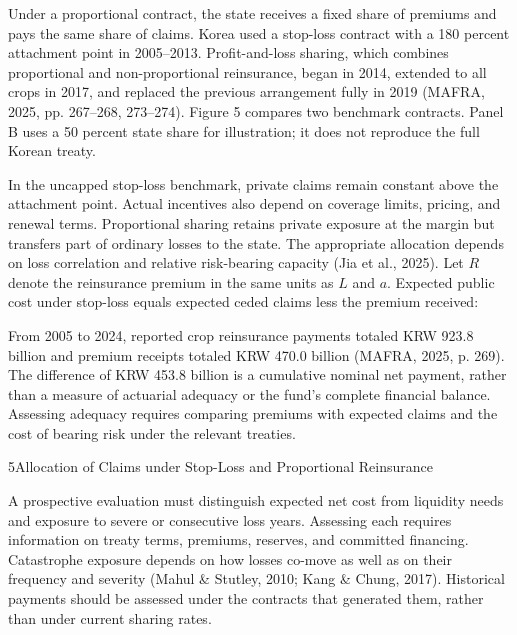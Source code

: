 
Under a proportional contract, the state receives a fixed share of premiums and pays the same share of claims. Korea used a stop-loss contract with a 180 percent attachment point in 2005--2013. Profit-and-loss sharing, which combines proportional and non-proportional reinsurance, began in 2014, extended to all crops in 2017, and replaced the previous arrangement fully in 2019 (MAFRA, 2025, pp. 267--268, 273--274). Figure 5 compares two benchmark contracts. Panel B uses a 50 percent state share for illustration; it does not reproduce the full Korean treaty.

In the uncapped stop-loss benchmark, private claims remain constant above the attachment point. Actual incentives also depend on coverage limits, pricing, and renewal terms. Proportional sharing retains private exposure at the margin but transfers part of ordinary losses to the state. The appropriate allocation depends on loss correlation and relative risk-bearing capacity (Jia et al., 2025). Let \(R\) denote the reinsurance premium in the same units as \(L\) and \(a\). Expected public cost under stop-loss equals expected ceded claims less the premium received:


From 2005 to 2024, reported crop reinsurance payments totaled KRW 923.8 billion and premium receipts totaled KRW 470.0 billion (MAFRA, 2025, p. 269). The difference of KRW 453.8 billion is a cumulative nominal net payment, rather than a measure of actuarial adequacy or the fund's complete financial balance. Assessing adequacy requires comparing premiums with expected claims and the cost of bearing risk under the relevant treaties.

\begin{wordfigure}{5}{Allocation of Claims under Stop-Loss and Proportional Reinsurance}
\end{wordfigure}

A prospective evaluation must distinguish expected net cost from liquidity needs and exposure to severe or consecutive loss years. Assessing each requires information on treaty terms, premiums, reserves, and committed financing. Catastrophe exposure depends on how losses co-move as well as on their frequency and severity (Mahul \& Stutley, 2010; Kang \& Chung, 2017). Historical payments should be assessed under the contracts that generated them, rather than under current sharing rates.
